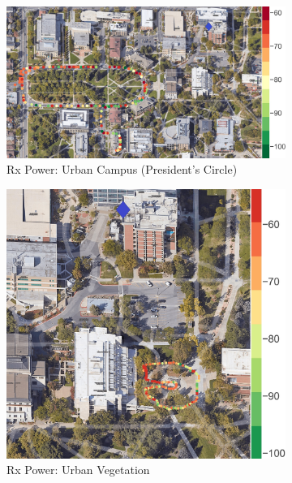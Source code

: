 \documentclass[10pt, twocolumn]{IEEEtran}
\begin{document}
\begin{figure} [t]
     \centering
     \begin{subfigure}{0.460\linewidth}
         \centering
         \includegraphics[width=1.0\linewidth]{figs/rx_urban_campus.jpg}
         \caption{Rx Power: Urban Campus (President's Circle)}
         \label{F4a}
     \end{subfigure}
     \begin{subfigure}{0.2579\linewidth}
         \centering
         \includegraphics[width=1.0\linewidth]{figs/rx_urban_vegetation.jpg}
         \caption{Rx Power: Urban Vegetation}
         \label{F4b}
     \end{subfigure}
     \begin{subfigure}{0.2579\linewidth}

\end{subfigure}
\end{figure}
\end{document}
